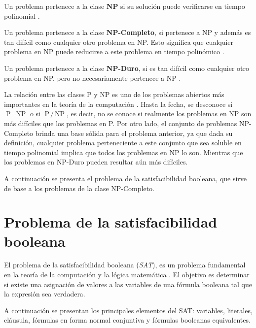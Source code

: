 \begin{definition}
  Un problema pertenece a la clase \textbf{NP} si su solución puede verificarse en tiempo polinomial \cite{authomataTheory}.
\end{definition}

\begin{definition}
  Un problema pertenece a la clase \textbf{NP-Completo}, si pertenece a NP y además es tan difícil como cualquier otro problema en NP. Esto significa que cualquier problema en NP puede reducirse a este problema en tiempo polinómico \cite{authomataTheory}.
\end{definition}

\begin{definition}
  Un problema pertenece a la clase \textbf{NP-Duro}, si es tan difícil como cualquier otro problema en NP, pero no necesariamente pertenece a NP \cite{authomataTheory}. 
\end{definition}

La relación entre las clases P y NP es uno de los problemas abiertos más importantes en la teoría de la computación 
\cite{authomataTheory}. Hasta la fecha, se desconoce si $\text{P} = \text{NP}$ o si $\text{P} \neq \text{NP}$, es decir, 
no se conoce si realmente los problemas en NP son más difíciles que los problemas en P. Por otro lado, el conjunto de 
problemas NP-Completo brinda una base sólida para el problema anterior, ya que dada su definición, cualquier problema 
perteneciente a este conjunto que sea soluble en tiempo polinomial implica que todos los problemas en NP lo son. 
Mientras que los problemas en NP-Duro pueden resultar aún más difíciles. 

A continuación se presenta el problema de la satisfacibilidad booleana, que sirve de base a los problemas de la clase NP-Completo.

\section{Problema de la satisfacibilidad booleana}

El problema de la satisfacibilidad booleana (\textit{SAT}), es un problema fundamental en la teoría de la computación y la lógica matemática \cite{authomataTheory}. El objetivo es determinar si existe una asignación de valores a las variables de una fórmula booleana tal que la expresión sea verdadera.

A continuación se presentan los principales elementos del SAT: variables, literales, cláusula, fórmulas en forma normal conjuntiva y fórmulas booleanas equivalentes.

